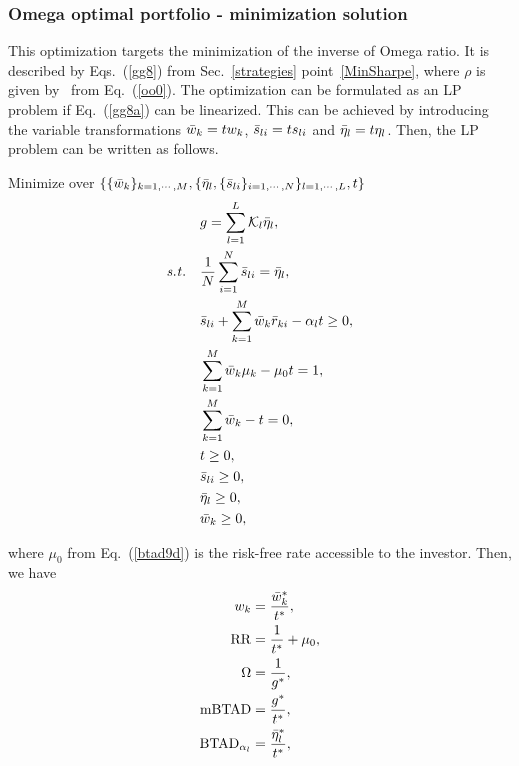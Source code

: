 

\BackToContents

\subsubsection{Omega optimal portfolio - minimization solution}
This optimization targets the minimization of the inverse of Omega ratio.
It is  described by Eqs.~(\ref{gg8}) from Sec.~\ref{strategies} point~\ref{MinSharpe}, where
$\rho$ is given by \mBTAD\ from Eq.~(\ref{oo0}).
The optimization can be formulated as an LP problem if Eq.~(\ref{gg8a}) can be linearized. This can be achieved by
introducing the variable transformations
${\bar w}_k = t w_k$, ${\bar s}_{li} = t s_{li}$ and ${\bar \eta}_l = t \eta_l$.
Then, the LP problem can be written as follows.

\bigskip
\noindent Minimize over $\{ \{{\bar w}_k\}_{k=1,\cdots,M}, \{ {\bar \eta}_l, \{ {\bar s}_{li} \}_{i=1,\cdots,N} \}_{l=1,\cdots,L}, t \}$
\begin{subequations}\label{btad9}
\begin{align}
    &g = \sum_{l=1}^L \cK_l \bbeta_l, \label{btad9a} \\
    \st &\frac{1}{N} \sum_{i=1}^N \bs_{li} = \bbeta_l, \label{btad9b} \\
    &\bs_{li}  + \sum_{k=1}^M \bw_k \br_{ki} - \alpha_l t \geq 0, \label{btad9c} \\
    &\sum_{k=1}^M \bw_k \mu_k -\mu_0 t = 1, \label{btad9d} \\
    &\sum_{k=1}^M \bw_k - t = 0, \label{btad9e} \\
    &t \geq 0, \label{btad9h} \\
    &\bs_{li} \geq 0, \label{btad9g} \\
    & \bbeta_l \geq 0, \label{btad9i} \\
    &\bw_k \geq 0, \label{btad9f}
\end{align}
\end{subequations}

\noindent where $\mu_0$ from Eq.~(\ref{btad9d}) is the risk-free rate accessible to the investor.
Then, we have
\begin{subequations}\label{btad10}
\begin{align}
    w_k &= \frac{\bw_k^*}{t^*} , \label{btad10a} \\
    \RR &= \frac{1}{t^*} + \mu_0, \label{btad10c} \\
    \Omega &= \frac{1}{g^*}, \label{btad10b} \\
    \mBTAD &= \frac{g^*}{t^*}, \label{btad10d} \\
    \BTAD_{\alpha_l} &= \frac{\bbeta_l^*}{t^*}, \label{btad10e}
\end{align}
\end{subequations}

